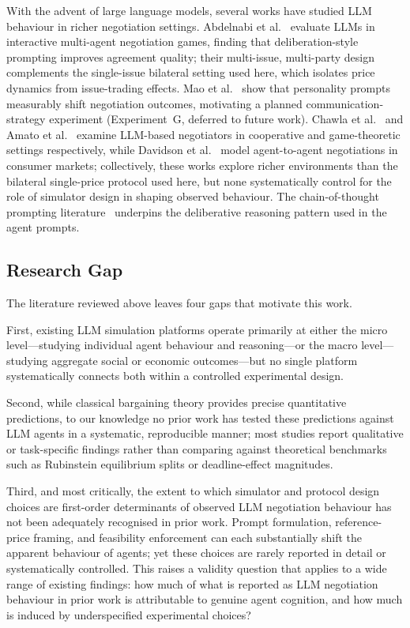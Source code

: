 With the advent of large language models, several works have studied LLM behaviour in richer negotiation settings.  Abdelnabi et al.~\cite{abdelnabi2024llmdeliberation} evaluate LLMs in interactive multi-agent negotiation games, finding that deliberation-style prompting improves agreement quality; their multi-issue, multi-party design complements the single-issue bilateral setting used here, which isolates price dynamics from issue-trading effects.  Mao et al.~\cite{mao2024personalities} show that personality prompts measurably shift negotiation outcomes, motivating a planned communication-strategy experiment (Experiment~G, deferred to future work).  Chawla et al.~\cite{chawla2023assistive} and Amato et al.~\cite{amato2024socialbehavior} examine LLM-based negotiators in cooperative and game-theoretic settings respectively, while Davidson et al.~\cite{davidson2024automatedrisky} model agent-to-agent negotiations in consumer markets; collectively, these works explore richer environments than the bilateral single-price protocol used here, but none systematically control for the role of simulator design in shaping observed behaviour.  The chain-of-thought prompting literature~\cite{wei2022chain} underpins the deliberative reasoning pattern used in the agent prompts.

\subsection{Research Gap}
\label{sec:rw_gap}

The literature reviewed above leaves four gaps that motivate this work.

First, existing LLM simulation platforms operate primarily at either the micro level---studying individual agent behaviour and reasoning---or the macro level---studying aggregate social or economic outcomes---but no single platform systematically connects both within a controlled experimental design.

Second, while classical bargaining theory provides precise quantitative predictions, to our knowledge no prior work has tested these predictions against LLM agents in a systematic, reproducible manner; most studies report qualitative or task-specific findings rather than comparing against theoretical benchmarks such as Rubinstein equilibrium splits or deadline-effect magnitudes.

Third, and most critically, the extent to which simulator and protocol design choices are first-order determinants of observed LLM negotiation behaviour has not been adequately recognised in prior work.  Prompt formulation, reference-price framing, and feasibility enforcement can each substantially shift the apparent behaviour of agents; yet these choices are rarely reported in detail or systematically controlled.  This raises a validity question that applies to a wide range of existing findings: how much of what is reported as LLM negotiation behaviour in prior work is attributable to genuine agent cognition, and how much is induced by underspecified experimental choices?

